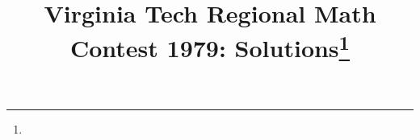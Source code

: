 \documentclass[10pt]{article}
\begin{document}
\title{Virginia Tech Regional Math Contest 1979: Solutions\footnote{\disclaimer}}
\author{\vspace{-2ex}}
\date{\vspace{-5ex}} %
\maketitle

% 




% 

% 




% 

% 

% 
\end{document}
